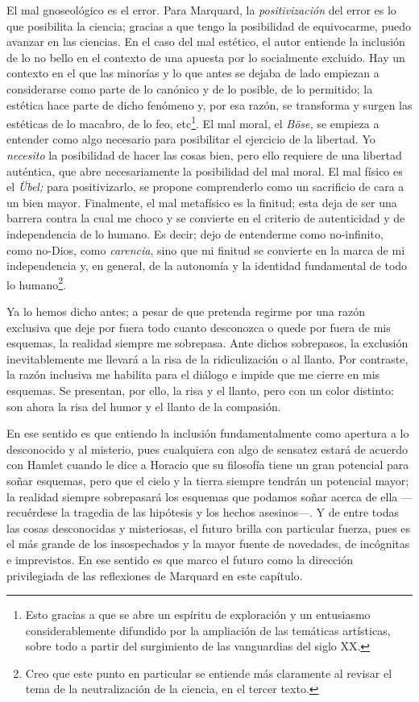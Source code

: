 \begin{refsection}
El mal gnoseológico es el error. Para Marquard, la \emph{positivización} del error es lo que posibilita la ciencia; gracias a que tengo la posibilidad de equivocarme, puedo avanzar en las ciencias. En el caso del mal estético, el autor entiende la inclusión de lo no bello en el contexto de una apuesta por lo socialmente excluido. Hay un contexto en el que las minorías y lo que antes se dejaba de lado empiezan a considerarse como parte de lo canónico y de lo posible, de lo permitido; la estética hace parte de dicho fenómeno y, por esa razón, se transforma y surgen las estéticas de lo macabro, de lo feo, etc\footnote{Esto gracias a que se abre un espíritu de exploración y un entusiasmo considerablemente difundido por la ampliación de las temáticas artísticas, sobre todo a partir del surgimiento de las vanguardias del siglo XX.}. El mal moral, el \emph{Böse,} se empieza a entender como algo necesario para posibilitar el ejercicio de la libertad. Yo \emph{necesito} la posibilidad de hacer las cosas bien, pero ello requiere de una libertad auténtica, que abre necesariamente la posibilidad del mal moral. El mal físico es el \emph{Übel;} para positivizarlo, se propone comprenderlo como un sacrificio de cara a un bien mayor. Finalmente, el mal metafísico es la finitud; esta deja de ser una barrera contra la cual me choco y se convierte en el criterio de autenticidad y de independencia de lo humano. Es decir; dejo de entenderme como no-infinito, como no-Dios, como \emph{carencia}, sino que mi finitud se convierte en la marca de mi independencia y, en general, de la autonomía y la identidad fundamental de todo lo humano\footnote{Creo que este punto en particular se entiende más claramente al revisar el tema de la neutralización de la ciencia, en el tercer texto.}.

Ya lo hemos dicho antes; a pesar de que pretenda regirme por una razón exclusiva que deje por fuera todo cuanto desconozca o quede por fuera de mis esquemas, la realidad siempre me sobrepasa. Ante dichos sobrepasos, la exclusión inevitablemente me llevará a la risa de la ridiculización o al llanto. Por contraste, la razón inclusiva me habilita para el diálogo e impide que me cierre en mis esquemas. Se presentan, por ello, la risa y el llanto, pero con un color distinto: son ahora la risa del humor y el llanto de la compasión.

\separador{}


En ese sentido es que entiendo la inclusión fundamentalmente como apertura a lo desconocido y al misterio, pues cualquiera con algo de sensatez estará de acuerdo con Hamlet cuando le dice a Horacio que su filosofía tiene un gran potencial para soñar esquemas, pero que el cielo y la tierra siempre tendrán un potencial mayor; la realidad siempre sobrepasará los esquemas que podamos soñar acerca de ella ---recuérdese la tragedia de las hipótesis y los hechos asesinos---. Y de entre todas las cosas desconocidas y misteriosas, el futuro brilla con particular fuerza, pues es el más grande de los insospechados y la mayor fuente de novedades, de incógnitas e imprevistos. En ese sentido es que marco el futuro como la dirección privilegiada de las reflexiones de Marquard en este capítulo.


\end{refsection}
